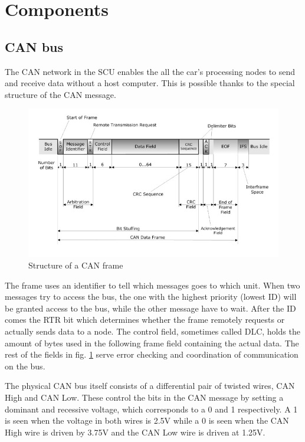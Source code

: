 \documentclass[conference]{IEEEtran}
\begin{document}
\section{Components}
\subsection{CAN bus}
The CAN network in the SCU enables the all the car's processing nodes to send and receive data without a host computer. This is possible thanks to the special structure of the CAN message.

\begin{figure}[h]
    \centering
    \includegraphics[scale=0.35]{documentation/images/detailed-can-data-frame-architecture.jpg}
    \caption{Structure of a CAN frame}
    \label{fig:CANframe}
\end{figure}

The frame uses an identifier to tell which messages goes to which unit. When two messages try to access the bus, the one with the highest priority (lowest ID) will be granted access to the bus, while the other message have to wait. After the ID comes the RTR bit which determines whether the frame remotely requests or actually sends data to a node. The control field, sometimes called DLC, holds the amount of bytes used in the following frame field containing the actual data. The rest of the fields in fig. \ref{fig:CANframe} serve error checking and coordination of communication on the bus.

The physical CAN bus itself consists of a differential pair of twisted wires, CAN High and CAN Low. These control the bits in the CAN message by setting a dominant and recessive voltage, which corresponds to a 0 and 1 respectively. A 1 is seen when the voltage in both wires is 2.5V while a 0 is seen when the CAN High wire is driven by 3.75V and the CAN Low wire is driven at 1.25V. 
\end{document}
